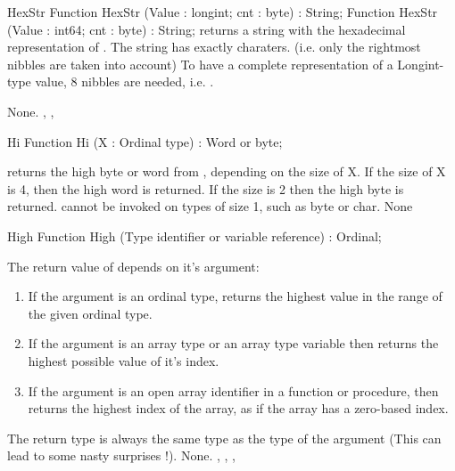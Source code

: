 
\begin{function}{HexStr}
\Declaration
Function HexStr (Value : longint; cnt : byte) : String;
Function HexStr (Value : int64; cnt : byte) : String;
\Description
{} returns a string with the hexadecimal representation
of . The string has exactly  charaters.
 (i.e. only the  rightmost nibbles are taken into account)
To have a complete representation of a Longint-type value, 8
nibbles are needed, i.e. .

\Errors
None.
\SeeAlso
{}, , 
\end{function}


\begin{function}{Hi}
\Declaration
Function Hi (X : Ordinal type) : Word or byte;

\Description
{} returns the high byte or word from , depending on the size
of X. If the size of X is 4, then the high word is returned. If the size is
2 then the high byte is returned.
 cannot be invoked on types of size 1, such as byte or char.
\Errors
None
\SeeAlso
{}
\end{function}


\begin{function}{High}
\Declaration
Function High (Type identifier or variable reference) : Ordinal;

\Description
 The return value of  depends on it's argument:
\begin{enumerate}
\item If the argument is an ordinal type,  returns the highest
 value in the range of the given ordinal type.
\item If the argument is an array type or an array type variable then
 returns the highest possible value of it's index.
\item If the argument is an open array identifier in a function or
procedure, then  returns the highest index of the array, as if the
array has a zero-based index.
\end{enumerate}
The return type is always the same type as the type of the argument
(This can lead to some nasty surprises !).
\Errors
None.
\SeeAlso
{}, , , 
\end{function}

